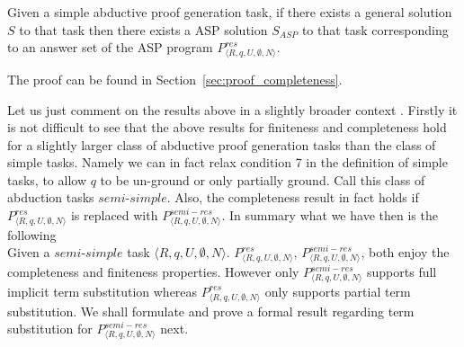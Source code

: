 
\begin{theorem}[Completeness]\label{thm:completeness}
  Given a simple abductive proof generation task, if there exists a general solution $S$ to that task then there
  exists a ASP solution $S_{ASP}$ to that task corresponding to an answer set of the ASP program $P_{\langle R,q,U,\emptyset,N\rangle}^{res}$.
\end{theorem}

The proof can be found in Section~\ref{sec:proof_completeness}.

Let us just comment on the results above in a slightly broader context . Firstly it is not difficult to see that the above results for finiteness and completeness hold for a slightly larger class of abductive proof generation tasks than the class of simple tasks. Namely we can in fact relax condition 7 in the definition of simple tasks, to allow $q$ to be un-ground or only partially ground. Call this class of abduction tasks $semi$-$simple$.  Also, the completeness result in fact holds if $P_{\langle R,q,U,\emptyset,N\rangle}^{res}$ is replaced with $P_{\langle R,q,U,\emptyset,N\rangle}^{semi-res}$. In summary what we have then is the following\\
Given a $\textit{semi-simple}$ task $\langle R,q,U,\emptyset,N\rangle$. $P_{\langle R,q,U,\emptyset,N\rangle}^{res}$, $P_{\langle R,q,U,\emptyset,N\rangle}^{semi-res}$, both enjoy the completeness and finiteness properties. However only $P_{\langle R,q,U,\emptyset,N\rangle}^{semi-res}$ supports full implicit term substitution whereas $P_{\langle R,q,U,\emptyset,N\rangle}^{res}$ only supports partial term substitution. We shall formulate and prove a formal result regarding term substitution for $P_{\langle R,q,U,\emptyset,N\rangle}^{semi-res}$ next.    

